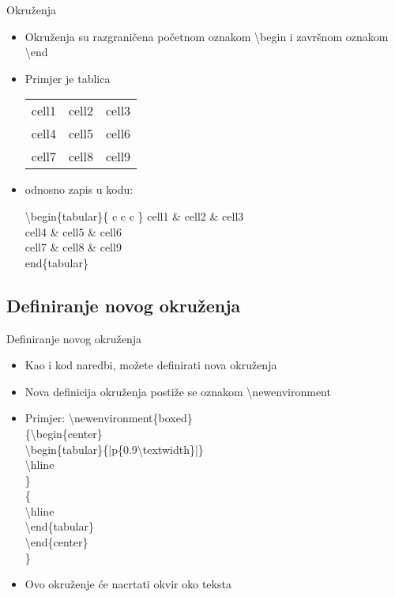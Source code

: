 \documentclass{beamer}
\begin{document}
\begin{frame}[t]{Okruženja}
\begin{itemize}
	\item Okruženja su razgraničena početnom oznakom \textbackslash begin i završnom oznakom \textbackslash end
	\item Primjer je tablica


\begin{tabular}{ c c c } 
  cell1 & cell2 & cell3 \\ 
  cell4 & cell5 & cell6 \\ 
  cell7 & cell8 & cell9 \\ 
 \end{tabular}

\item odnosno zapis u kodu:

\textbackslash begin\{tabular\}\{ c c c \} 
  cell1 \& cell2 \& cell3 \\ 
  cell4 \& cell5 \& cell6 \\ 
  cell7 \& cell8 \& cell9 \\ 
 end\{tabular\}


\end{itemize}
\end{frame}

\subsection{Definiranje novog okruženja}

\begin{frame}{Definiranje novog okruženja}
\begin{itemize}

\item Kao i kod naredbi, možete definirati nova okruženja
\item Nova definicija okruženja postiže se oznakom \textbackslash newenvironment
\item Primjer:
\textbackslash newenvironment\{boxed\}\\
\{\textbackslash begin\{center\}\\
    \textbackslash begin\{tabular\}\{|p\{0.9\textbackslash textwidth\}|\}\\
    \textbackslash hline\\
    \}\\
    \{ \\
    \textbackslash hline\\
    \textbackslash end\{tabular\} \\
    \textbackslash end\{center\}\\
    \}\\
    \item Ovo okruženje će nacrtati okvir oko teksta
\end{itemize}
\end{frame}
\end{document}

